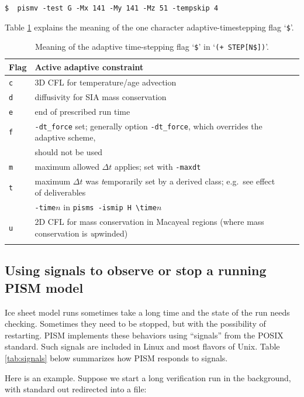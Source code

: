 \documentclass[11pt,final]{amsart}
\begin{document}
\verb|$  pismv -test G -Mx 141 -My 141 -Mz 51 -tempskip 4|

Table \ref{tab:adaptiveflag} explains the meaning of the one character adaptive-timestepping flag `\verb|$|'.

\begin{table}[h]
\caption{Meaning of the adaptive time-stepping flag `\texttt{\$}' in `\texttt{(+    STEP[N\$])}'.}\label{tab:adaptiveflag}
\begin{tabular}{@{}llll}\hline
\textbf{Flag} & \textbf{Active adaptive constraint} \\ \hline
\verb|c| & 3D CFL for temperature/age advection \cite{BBL} \\
\verb|d| & diffusivity for SIA mass conservation \cite{BBL} \\
\verb|e| & end of prescribed run time \\
\verb|f| & \verb|-dt_force| set; generally option \verb|-dt_force|, which overrides the adaptive scheme, \\
 & should not be used  \\
\verb|m| & maximum allowed $\Delta t$ applies; set with \verb|-maxdt| \\
\verb|t| & maximum $\Delta t$ was \emph{t}emporarily set by a derived class; e.g.~see effect of deliverables \\
 & \verb|-time|$n$ in \verb|pisms -ismip H \time|$n$ \\
\verb|u| & 2D CFL for mass conservation in Macayeal regions (where mass conservation is \emph{u}pwinded)\\
\hline
\normalsize
\end{tabular}
\end{table}

\subsection{Using signals to observe or stop a running PISM model} \label{subsect:signal}  Ice sheet model runs sometimes take a long time and the state of the run needs checking.  Sometimes they need to be stopped, but with the possibility of restarting.  PISM implements these behaviors using ``signals'' from the POSIX standard.  Such signals are included in Linux and most flavors of Unix.  Table \ref{tab:signals} below summarizes how PISM responds to signals.

Here is an example.  Suppose we start a long verification run in the background, with standard out redirected into a file:
\end{document}
